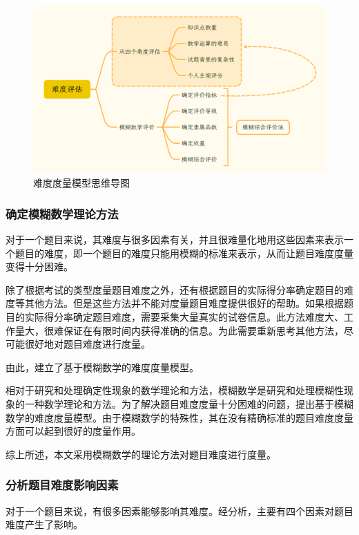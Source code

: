 \begin{figure}[h]
    \centering
    \includegraphics[scale=0.3]{res/figure040041.png}
    \caption{难度度量模型思维导图}
\end{figure}

\subsubsection{确定模糊数学理论方法}

对于一个题目来说，其难度与很多因素有关，并且很难量化地用这些因素来表示一个题目的难度，即一个题目的难度只能用模糊的标准来表示，从而让题目难度度量变得十分困难。

除了根据考试的类型度量题目难度之外，还有根据题目的实际得分率确定题目的难度等其他方法。但是这些方法并不能对度量题目难度提供很好的帮助。如果根据题目的实际得分率确定题目难度，需要采集大量真实的试卷信息。此方法难度大、工作量大，很难保证在有限时间内获得准确的信息。为此需要重新思考其他方法，尽可能很好地对题目难度进行度量。

由此，建立了基于模糊数学的难度度量模型。

相对于研究和处理确定性现象的数学理论和方法，模糊数学是研究和处理模糊性现象的一种数学理论和方法\cite{MoHuShuXue}。为了解决题目难度度量十分困难的问题，提出基于模糊数学的难度度量模型。由于模糊数学的特殊性，其在没有精确标准的题目难度度量方面可以起到很好的度量作用。

综上所述，本文采用模糊数学的理论方法对题目难度进行度量。

\subsubsection{分析题目难度影响因素}

对于一个题目来说，有很多因素能够影响其难度。经分析，主要有四个因素对题目难度产生了影响。

